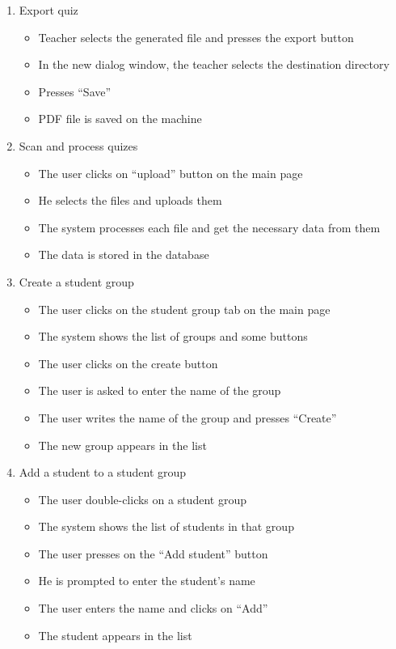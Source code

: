 \begin{enumerate}
  \item Export quiz
  \begin{itemize}
    \item Teacher selects the generated file and presses the export button
    \item In the new dialog window, the teacher selects the destination directory
    \item Presses “Save”
    \item PDF file is saved on the machine
  \end{itemize}

  \item Scan and process quizes
  \begin{itemize}
    \item The user clicks on “upload” button on the main page
    \item He selects the files and uploads them
    \item The system processes each file and get the necessary data from them
    \item The data is stored in the database
  \end{itemize}

  \item Create a student group
  \begin{itemize}
    \item The user clicks on the student group tab on the main page
    \item The system shows the list of groups and some buttons
    \item The user clicks on the create button
    \item The user is asked to enter the name of the group
    \item The user writes the name of the group and presses “Create”
    \item The new group appears in the list
  \end{itemize}

  \item Add a student to a student group
  \begin{itemize}
    \item The user double-clicks on a student group
    \item The system shows the list of students in that group
    \item The user presses on the “Add student” button
    \item He is prompted to enter the student’s name
    \item The user enters the name and clicks on “Add”
    \item The student appears in the list
  \end{itemize}
\end{enumerate}

